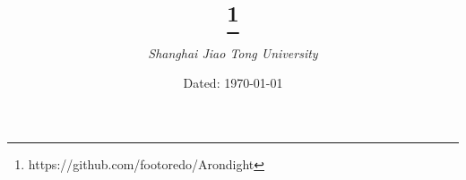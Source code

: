 \documentclass[titlepage, a4paper]{book}
\title{\Huge{\textgoth{Arondight's Standard Code Library}}\thanks{https://github.com/footoredo/Arondight}}
\author{\emph{Shanghai Jiao Tong University}}
\date{Dated: \today}
\begin{document}
	\maketitle
	\tableofcontents
	\begin{spacing}{0.8}
		
	\end{spacing}
\end{document}
